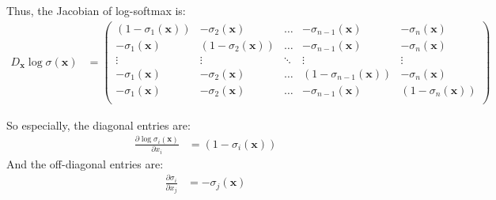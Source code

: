 Thus, the Jacobian of log-softmax is:
\begin{align*}
D_{\boldsymbol{x}} \log \sigma(\boldsymbol{x}) &=
\begin{pmatrix}
(1 - \sigma_1(\boldsymbol{x})) & -\sigma_2(\boldsymbol{x}) & \dots & -\sigma_{n-1}(\boldsymbol{x}) & -\sigma_n(\boldsymbol{x}) \\
-\sigma_1(\boldsymbol{x}) & (1 - \sigma_2(\boldsymbol{x})) & \dots & -\sigma_{n-1}(\boldsymbol{x}) & -\sigma_n(\boldsymbol{x}) \\
\vdots & \vdots & \ddots & \vdots & \vdots \\
-\sigma_1(\boldsymbol{x}) & -\sigma_2(\boldsymbol{x}) & \dots & (1 - \sigma_{n-1}(\boldsymbol{x})) & -\sigma_n(\boldsymbol{x}) \\
-\sigma_1(\boldsymbol{x}) & -\sigma_2(\boldsymbol{x}) & \dots & -\sigma_{n-1}(\boldsymbol{x}) & (1 - \sigma_n(\boldsymbol{x})) \\
\end{pmatrix}
\end{align*}

So especially, the diagonal entries are:
\begin{align*}
\frac{\partial \log \sigma_i(\boldsymbol{x})}{\partial x_i} &= (1 - \sigma_i(\boldsymbol{x}))
\end{align*}
And the off-diagonal entries are:
\begin{align*}
\frac{\partial \sigma_i}{\partial x_j} &= -\sigma_j(\boldsymbol{x})
\end{align*}


